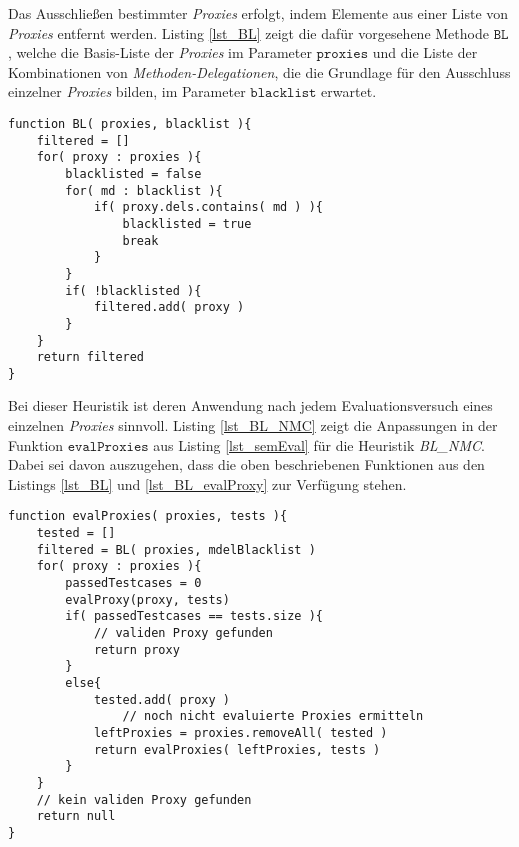 \noindent
Das Ausschließen bestimmter \emph{Proxies} erfolgt, indem Elemente aus einer Liste von \emph{Proxies} entfernt werden. Listing \ref{lst_BL} zeigt die dafür vorgesehene Methode $\texttt{BL}$, welche die Basis-Liste der \emph{Proxies} im Parameter $\texttt{proxies}$ und die Liste der Kombinationen von \emph{Methoden-Delegationen}, die die Grundlage für den Ausschluss einzelner \emph{Proxies} bilden, im Parameter $\texttt{blacklist}$ erwartet.
\begin{lstlisting}[style = pseudo, label = lst_BL, caption=Blacklist-Methode für Heuristil BL\_NMC, captionpos = b]
function BL( proxies, blacklist ){
	filtered = []	
	for( proxy : proxies ){
		blacklisted = false
		for( md : blacklist ){
			if( proxy.dels.contains( md ) ){
				blacklisted = true
				break
			}	
		}
		if( !blacklisted ){
			filtered.add( proxy )
		}
	}
	return filtered
}

\end{lstlisting}
\noindent
Bei dieser \Gls{Heuristik} ist deren Anwendung nach jedem Evaluationsversuch eines einzelnen \emph{Proxies} sinnvoll. Listing \ref{lst_BL_NMC} zeigt die Anpassungen in der Funktion $\texttt{evalProxies}$ aus Listing \ref{lst_semEval} für die Heuristik \emph{BL\_NMC}. Dabei sei davon auszugehen, dass die oben beschriebenen Funktionen aus den Listings \ref{lst_BL} und \ref{lst_BL_evalProxy} zur Verfügung stehen.
\begin{lstlisting}[style = pseudo, caption=Evaluation mehrere Proxies mit BL\_MNC, captionpos=b, label = lst_BL_NMC]
function evalProxies( proxies, tests ){
	tested = []
	filtered = BL( proxies, mdelBlacklist )
	for( proxy : proxies ){
		passedTestcases = 0
		evalProxy(proxy, tests)
		if( passedTestcases == tests.size ){
			// validen Proxy gefunden
			return proxy
		}
		else{
			tested.add( proxy )
				// noch nicht evaluierte Proxies ermitteln
			leftProxies = proxies.removeAll( tested )	
			return evalProxies( leftProxies, tests )
		}
	}
	// kein validen Proxy gefunden
	return null
}
\end{lstlisting}
\noindent